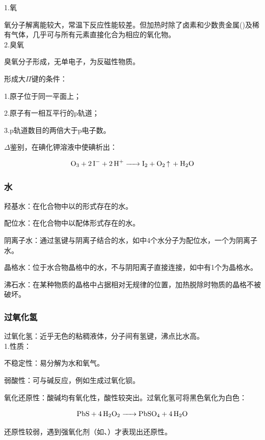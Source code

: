 \documentclass[a4paper,UTF8]{article}
\begin{document}
1.氧

氧分子解离能较大，常温下反应性能较差。但加热时除了卤素和少数贵金属()及稀有气体，几乎可与所有元素直接化合为相应的氧化物。\\

2.臭氧

臭氧分子形成，无单电子，为反磁性物质。

\begin{tcolorbox}

形成大$\Pi$键的条件：

1.原子位于同一平面上；

2.原子有一相互平行的p轨道；

3.p轨道数目的两倍大于p电子数。

\end{tcolorbox}

$\Delta$鉴别，在碘化钾溶液中使碘析出：

$$ \ce{O3 + 2I- + 2H+ -> I2 + O2\ce{^} + H2O} $$

\subsubsection{水}

羟基水：在化合物中以的形式存在的水。

配位水：在化合物中以配体形式存在的水。

阴离子水：通过氢键与阴离子结合的水，如中4个水分子为配位水，一个为阴离子水。

晶格水：位于水合物晶格中的水，不与阴阳离子直接连接，如中有1个为晶格水。

沸石水：在某种物质的晶格中占据相对无规律的位置，加热脱除时物质的晶格不被破坏。

\subsubsection{过氧化氢}

过氧化氢：近乎无色的粘稠液体，分子间有氢键，沸点比水高。\\

1.性质：

不稳定性：易分解为水和氧气。

弱酸性：可与碱反应，例如生成过氧化钡。

氧化还原性：酸碱均有氧化性，酸性较突出。过氧化氢可将黑色氧化为白色：

$$ \ce{PbS + 4H2O2 -> PbSO4 + 4H2O} $$

还原性较弱，遇到强氧化剂（如、）才表现出还原性。
\end{document}
